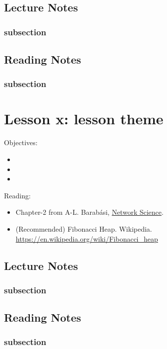 \documentclass[11pt]{scrartcl} %
\begin{document}
\subsection{Lecture Notes}

\subsubsection{subsection}
\textbf{}

\subsection{Reading Notes}

\subsubsection{subsection}
\textbf{}


\section{Lesson x: lesson theme}

Objectives:
\begin{itemize}
	\item 
	\item 
	\item 
\end{itemize}

Reading:
\begin{itemize}
	\item Chapter-2 from A-L. Barabási, \href{http://networksciencebook.com/}{Network Science}.
	\item (Recommended) Fibonacci Heap. Wikipedia. \url{https://en.wikipedia.org/wiki/Fibonacci\_heap}
\end{itemize}

\subsection{Lecture Notes}

\subsubsection{subsection}
\textbf{}

\subsection{Reading Notes}

\subsubsection{subsection}
\textbf{}

\end{document}
